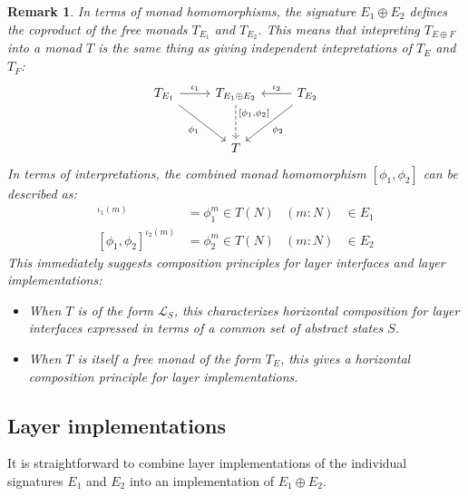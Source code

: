 \documentclass[11pt,oneside,draft]{book}
\newtheorem{remark}[theorem]{Remark}
\theoremstyle{definition}
\begin{document}
\begin{remark}
In terms of monad homomorphisms,
the signature $E_1 \oplus E_2$ defines the coproduct
of the free monads $T_{E_1}$ and $T_{E_2}$.
This means that intepreting $T_{E \oplus F}$ into a monad $T$
is the same thing as giving independent intepretations
of $T_E$ and $T_F$:
\[
  \begin{tikzcd}[row sep=large]
    T_{E_1} \ar[r, "\iota_1"] \ar[dr, "\phi_1"'] &
    T_{E_1 \oplus E_2}
      \ar[d, "{[\phi_1, \phi_2]}", dashed, near start] &
    T_{E_2} \ar[l, "\iota_2"'] \ar[dl, "\phi_2"]
    \\
    & T &
  \end{tikzcd}
\]
In terms of interpretations,
the combined monad homomorphism $[\phi_1, \phi_2]$
can be described as:
\begin{align*}
  [\phi_1, \phi_2]^{\iota_1(m)} &= \phi_1^m \in T(N)
    & (m \mathbin: N) &\in E_1 \\
  [\phi_1, \phi_2]^{\iota_2(m)} &= \phi_2^m \in T(N)
    & (m \mathbin: N) &\in E_2
\end{align*}
This immediately suggests composition principles
for layer interfaces and layer implementations:
\begin{itemize}
  \item
    When $T$ is of the form $\mathcal{L}_S$,
    this characterizes horizontal composition for layer interfaces
    expressed in terms of a common set of abstract states $S$.
  \item
    When $T$ is itself a free monad of the form $T_E$,
    this gives a horizontal composition principle
    for layer implementations.
\end{itemize}
\end{remark}


\subsection{Layer implementations} %

It is straightforward
to combine layer implementations
of the individual signatures $E_1$ and $E_2$
into an implementation of $E_1 \oplus E_2$.
\end{document}
